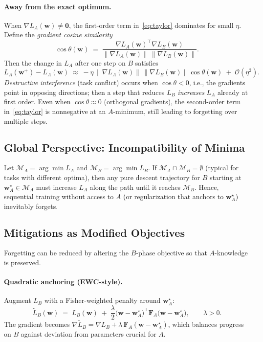 \documentclass[12pt]{article}
\begin{document}
\paragraph{Away from the exact optimum.}
When $\nabla L_A(\mathbf{w})\neq \mathbf{0}$, the first-order term in~\eqref{eq:taylor} dominates for
small $\eta$. Define the \emph{gradient cosine similarity}
\begin{equation}
\cos\theta(\mathbf{w}) \;=\;
\frac{\nabla L_A(\mathbf{w})^\top \nabla L_B(\mathbf{w})}
{\|\nabla L_A(\mathbf{w})\|\,\|\nabla L_B(\mathbf{w})\|}.
\end{equation}
Then the change in $L_A$ after one step on $B$ satisfies
\begin{equation}
L_A(\mathbf{w}^{+}) - L_A(\mathbf{w})
\;\approx\; -\eta\, \|\nabla L_A(\mathbf{w})\|\,\|\nabla L_B(\mathbf{w})\| \cos\theta(\mathbf{w})
\;+\; \mathcal{O}(\eta^2).
\end{equation}
\emph{Destructive interference} (task conflict) occurs when $\cos\theta<0$, i.e., the gradients point
in opposing directions; then a step that reduces $L_B$ \emph{increases} $L_A$ already at first order.
Even when $\cos\theta\approx 0$ (orthogonal gradients), the second-order term in~\eqref{eq:taylor} is
nonnegative at an $A$-minimum, still leading to forgetting over multiple steps.

\subsection{Global Perspective: Incompatibility of Minima}
Let $\mathcal{M}_A=\arg\min L_A$ and $\mathcal{M}_B=\arg\min L_B$. If
$\mathcal{M}_A\cap \mathcal{M}_B=\emptyset$ (typical for tasks with different optima), then any pure
descent trajectory for $B$ starting at $\mathbf{w}_A^\star\in\mathcal{M}_A$ must increase $L_A$ along
the path until it reaches $\mathcal{M}_B$. Hence, sequential training without access to $A$ (or
regularization that anchors to $\mathbf{w}_A^\star$) inevitably forgets.

\subsection{Mitigations as Modified Objectives}
Forgetting can be reduced by altering the $B$-phase objective so that $A$-knowledge is preserved.

\paragraph{Quadratic anchoring (EWC-style).}
Augment $L_B$ with a Fisher-weighted penalty around $\mathbf{w}_A^\star$:
\begin{equation}
\tilde{L}_B(\mathbf{w}) \;=\; L_B(\mathbf{w}) \;+\; \frac{\lambda}{2}
\big(\mathbf{w}-\mathbf{w}_A^\star\big)^\top \mathbf{F}_A \big(\mathbf{w}-\mathbf{w}_A^\star\big),
\qquad \lambda>0.
\end{equation}
The gradient becomes
$\nabla \tilde{L}_B = \nabla L_B + \lambda\, \mathbf{F}_A(\mathbf{w}-\mathbf{w}_A^\star)$,
which balances progress on $B$ against deviation from parameters crucial for $A$.
\end{document}
